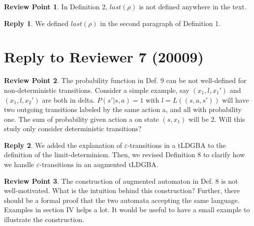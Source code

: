 \documentclass[10 pt, dvipdfmx]{article}
\theoremstyle{definition}
\newtheorem{review point}{Review Point}[section]
\newtheorem*{reply}{Reply}
\begin{document}
\begin{review point}
  In Definition 2, $last(\rho)$ is not defined anywhere in the text.
\end{review point}

\begin{reply}
  We defined $last(\rho)$ in the second paragraph of Definition 1.
\end{reply}

\section{Reply to Reviewer 7 (20009)}

\begin{review point}
  The probability function in Def. 9 can be not well-defined for
non-deterministic transitions. Consider a simple example, say $(x_1, l,
x_1')$ and $(x_1, l, x_2')$ are both in delta. $P(s'|s, a) =1$ with $l=
L((s,a,s'))$ will have two outgoing transitions labeled by the same
action a, and all with probability one. The sum of probability given
action a on state $(s, x_1)$ will be 2. Will this study only consider
deterministic transitions?
\end{review point}

\begin{reply}
  We added the explanation of $\varepsilon$-transitions in a tLDGBA to the definition of the limit-determinism. Then, we revised Definition 8 to clarify how we handle $\varepsilon$-transitions in an augmented tLDGBA.
\end{reply}

\begin{review point}
  The construction of augmented automaton in Def. 8 is not
well-motivated. What is the intuition behind this construction?
Further, there should be a formal proof that the two automata accepting
the same language. Examples in section IV helps a lot. It would be
useful to have a small example to illustrate the construction.
\end{review point}
\end{document}
